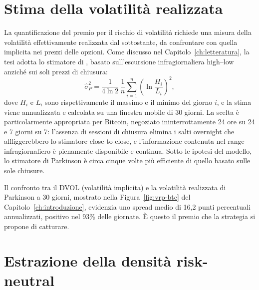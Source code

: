 \section{Stima della volatilità realizzata}
\label{sec:dati-rv}

La quantificazione del premio per il rischio di volatilità richiede una
misura della volatilità effettivamente realizzata dal sottostante, da
confrontare con quella implicita nei prezzi delle opzioni. Come discusso
nel Capitolo~\ref{ch:letteratura}, la tesi adotta lo stimatore di
\citet{parkinson1980extreme}, basato sull'escursione infragiornaliera
high--low anziché sui soli prezzi di chiusura:
%
\begin{equation}
\hat{\sigma}^2_{P} = \frac{1}{4\ln 2}\,\frac{1}{n}\sum_{i=1}^{n}
\left(\ln \frac{H_i}{L_i}\right)^2,
\label{eq:parkinson}
\end{equation}
%
dove $H_i$ e $L_i$ sono rispettivamente il massimo e il minimo del giorno
$i$, e la stima viene annualizzata e calcolata su una finestra mobile di 30
giorni. La scelta è particolarmente appropriata per Bitcoin, negoziato
ininterrottamente 24 ore su 24 e 7 giorni su 7: l'assenza di sessioni di
chiusura elimina i salti overnight che affliggerebbero lo stimatore
close-to-close, e l'informazione contenuta nel range infragiornaliero è
pienamente disponibile e continua. Sotto le ipotesi del modello, lo
stimatore di Parkinson è circa cinque volte più efficiente di quello basato
sulle sole chiusure.

Il confronto tra il DVOL (volatilità implicita) e la volatilità realizzata
di Parkinson a 30 giorni, mostrato nella Figura~\ref{fig:vrp-btc} del
Capitolo~\ref{ch:introduzione}, evidenzia uno spread medio di 16,2 punti
percentuali annualizzati, positivo nel 93\% delle giornate. È questo il
premio che la strategia si propone di catturare.

\section{Estrazione della densità risk-neutral}
\label{sec:dati-rnd}


